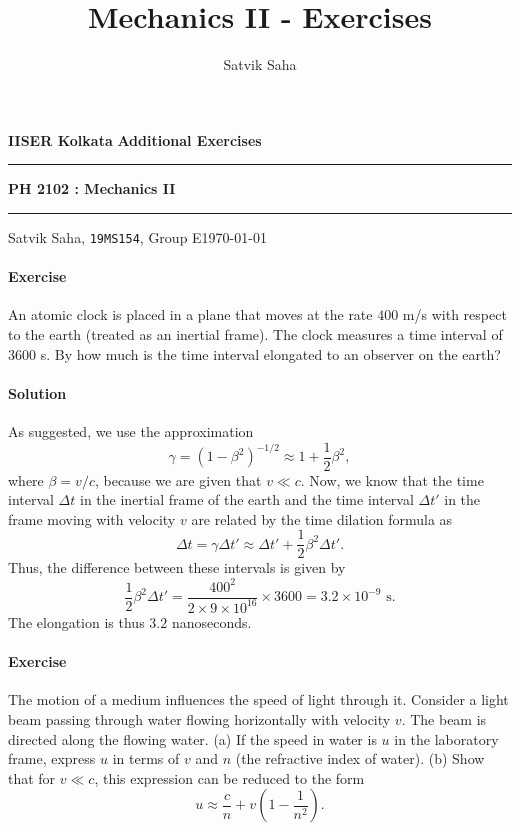 \documentclass[10pt]{article}
\title{Mechanics II - Exercises}
\author{Satvik Saha}
\date{}
\newcounter{prob}
\def\problem{\stepcounter{prob}\paragraph{Exercise \arabic{prob}}}
\def\solution{\paragraph{Solution}}
\begin{document}
        \par\textbf{IISER Kolkata} \hfill \textbf{Additional Exercises}
        \vspace{3pt}
        \hrule
        \vspace{3pt}
        \begin{center}
                \LARGE{\textbf{PH 2102 : Mechanics II}}
        \end{center}
        \vspace{3pt}
        \hrule
        \vspace{3pt}
        Satvik Saha, \texttt{19MS154}, Group E\hfill\today
        \vspace{20pt}

        \problem An atomic clock is placed in a plane that moves at the rate $400$ m/s with respect to the earth (treated as an inertial frame).
        The clock measures a time interval of $3600$ s. By how much is the time interval elongated to an observer on the earth?

        \solution As suggested, we use the approximation
        \[
                \gamma = (1 - \beta^2)^{-1 /2} \approx 1 + \frac{1}{2} \beta^2,
        \]
        where $\beta = v / c$, because we are given that $v \ll c$.
        Now, we know that the time interval $\Delta t$ in the inertial frame of the earth and the time interval $\Delta t'$ in 
        the frame moving with velocity $v$ are related by the time dilation formula as
        \[
                \Delta t = \gamma \Delta t' \approx \Delta t' + \frac{1}{2}\beta^2 \Delta t'.
        \]
        Thus, the difference between these intervals is given by
        \[
                \frac{1}{2}\beta^2 \Delta t' = \frac{400^2}{2 \times 9 \times 10^{16}}\times 3600 = 3.2 \times 10^{-9} \text{ s}.
        \]
        The elongation is thus $3.2$ nanoseconds.

        \problem The motion of a medium influences the speed of light through it. Consider a light beam passing through water flowing
        horizontally with velocity $v$. The beam is directed along the flowing water.
        (a) If the speed in water is $u$ in the laboratory frame, express $u$ in terms of $v$ and $n$ (the refractive index of water).
        (b) Show that for $v \ll c$, this expression can be reduced to the form
        \[
                u \approx \frac{c}{n} + v\left(1 - \frac{1}{n^2}\right).
        \]
\end{document}
